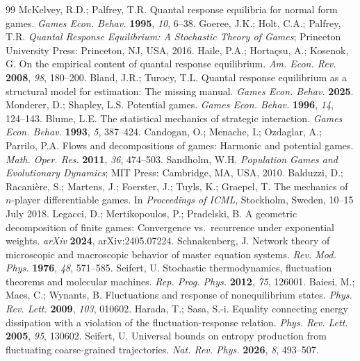\documentclass[10pt,a4paper]{article}
\begin{document}
\begin{thebibliography}{99}
\small
{} McKelvey, R.D.; Palfrey, T.R. Quantal response equilibria for normal form games. \emph{Games Econ. Behav.} \textbf{1995}, \emph{10}, 6--38.
 Goeree, J.K.; Holt, C.A.; Palfrey, T.R. \emph{Quantal Response Equilibrium: A Stochastic Theory of Games}; Princeton University Press: Princeton, NJ, USA, 2016.
 Haile, P.A.; Horta\c{c}su, A.; Kosenok, G. On the empirical content of quantal response equilibrium. \emph{Am. Econ. Rev.} \textbf{2008}, \emph{98}, 180--200.
 Bland, J.R.; Turocy, T.L. Quantal response equilibrium as a structural model for estimation: The missing manual. \emph{Games Econ. Behav.} \textbf{2025}.
 Monderer, D.; Shapley, L.S. Potential games. \emph{Games Econ. Behav.} \textbf{1996}, \emph{14}, 124--143.
 Blume, L.E. The statistical mechanics of strategic interaction. \emph{Games Econ. Behav.} \textbf{1993}, \emph{5}, 387--424.
 Candogan, O.; Menache, I.; Ozdaglar, A.; Parrilo, P.A. Flows and decompositions of games: Harmonic and potential games. \emph{Math. Oper. Res.} \textbf{2011}, \emph{36}, 474--503.
 Sandholm, W.H. \emph{Population Games and Evolutionary Dynamics}; MIT Press: Cambridge, MA, USA, 2010.
 Balduzzi, D.; Racani\`ere, S.; Martens, J.; Foerster, J.; Tuyls, K.; Graepel, T. The mechanics of $n$-player differentiable games. In \emph{Proceedings of ICML}, Stockholm, Sweden, 10--15 July 2018.
 Legacci, D.; Mertikopoulos, P.; Pradelski, B. A geometric decomposition of finite games: Convergence vs.\ recurrence under exponential weights. \emph{arXiv} \textbf{2024}, arXiv:2405.07224.
 Schnakenberg, J. Network theory of microscopic and macroscopic behavior of master equation systems. \emph{Rev. Mod. Phys.} \textbf{1976}, \emph{48}, 571--585.
 Seifert, U. Stochastic thermodynamics, fluctuation theorems and molecular machines. \emph{Rep. Prog. Phys.} \textbf{2012}, \emph{75}, 126001.
 Baiesi, M.; Maes, C.; Wynants, B. Fluctuations and response of nonequilibrium states. \emph{Phys. Rev. Lett.} \textbf{2009}, \emph{103}, 010602.
 Harada, T.; Sasa, S.-i. Equality connecting energy dissipation with a violation of the fluctuation-response relation. \emph{Phys. Rev. Lett.} \textbf{2005}, \emph{95}, 130602.
 Seifert, U. Universal bounds on entropy production from fluctuating coarse-grained trajectories. \emph{Nat. Rev. Phys.} \textbf{2026}, \emph{8}, 493--507.

\end{thebibliography}
\end{document}
